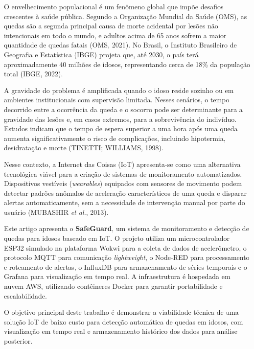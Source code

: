 \documentclass[a4paper,12pt]{article}
\begin{document}
O envelhecimento populacional é um fenômeno global que impõe desafios crescentes à saúde pública. Segundo a Organização Mundial da Saúde (OMS), as quedas são a segunda principal causa de morte acidental por lesões não intencionais em todo o mundo, e adultos acima de 65 anos sofrem a maior quantidade de quedas fatais (OMS, 2021). No Brasil, o Instituto Brasileiro de Geografia e Estatística (IBGE) projeta que, até 2030, o país terá aproximadamente 40 milhões de idosos, representando cerca de 18\% da população total (IBGE, 2022).

A gravidade do problema é amplificada quando o idoso reside sozinho ou em ambientes institucionais com supervisão limitada. Nesses cenários, o tempo decorrido entre a ocorrência da queda e o socorro pode ser determinante para a gravidade das lesões e, em casos extremos, para a sobrevivência do indivíduo. Estudos indicam que o tempo de espera superior a uma hora após uma queda aumenta significativamente o risco de complicações, incluindo hipotermia, desidratação e morte (TINETTI; WILLIAMS, 1998).

Nesse contexto, a Internet das Coisas (IoT) apresenta-se como uma alternativa tecnológica viável para a criação de sistemas de monitoramento automatizados. Dispositivos vestíveis (\textit{wearables}) equipados com sensores de movimento podem detectar padrões anômalos de aceleração característicos de uma queda e disparar alertas automaticamente, sem a necessidade de intervenção manual por parte do usuário (MUBASHIR \textit{et al.}, 2013).

Este artigo apresenta o \textbf{SafeGuard}, um sistema de monitoramento e detecção de quedas para idosos baseado em IoT. O projeto utiliza um microcontrolador ESP32 simulado na plataforma Wokwi para a coleta de dados de acelerômetro, o protocolo MQTT para comunicação \textit{lightweight}, o Node-RED para processamento e roteamento de alertas, o InfluxDB para armazenamento de séries temporais e o Grafana para visualização em tempo real. A infraestrutura é hospedada em nuvem AWS, utilizando contêineres Docker para garantir portabilidade e escalabilidade.

O objetivo principal deste trabalho é demonstrar a viabilidade técnica de uma solução IoT de baixo custo para detecção automática de quedas em idosos, com visualização em tempo real e armazenamento histórico dos dados para análise posterior.

\end{document}
